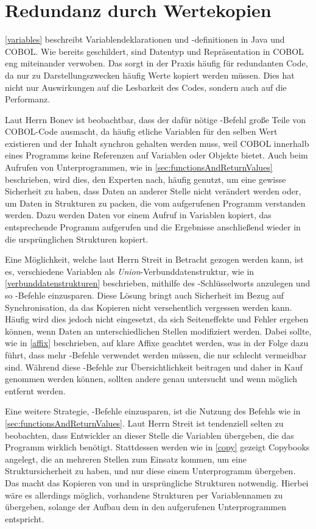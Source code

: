 \section{Redundanz durch Wertekopien}
\autoref{variables} beschreibt Variablendeklarationen und -definitionen in Java und COBOL. Wie bereits geschildert, sind Datentyp und Repräsentation in COBOL eng miteinander verwoben. Das sorgt in der Praxis häufig für redundanten Code, da nur zu Darstellungszwecken häufig Werte kopiert werden müssen. Dies hat nicht nur Auswirkungen auf die Lesbarkeit des Codes, sondern auch auf die Performanz.

Laut Herrn Bonev ist beobachtbar, dass der dafür nötige -Befehl große Teile von COBOL-Code ausmacht, da häufig etliche Variablen für den selben Wert existieren und der Inhalt synchron gehalten werden muss, weil COBOL innerhalb eines Programms keine Referenzen auf Variablen oder Objekte bietet. Auch beim Aufrufen von Unterprogrammen, wie in \autoref{sec:functionsAndReturnValues} beschrieben, wird dies, den Experten nach, häufig genutzt, um eine gewisse Sicherheit zu haben, dass Daten an anderer Stelle nicht verändert werden oder, um Daten in Strukturen zu packen, die vom aufgerufenen Programm verstanden werden. Dazu werden Daten vor einem Aufruf in Variablen kopiert, das entsprechende Programm aufgerufen und die Ergebnisse anschließend wieder in die ursprünglichen Strukturen kopiert.

Eine Möglichkeit, welche laut Herrn Streit in Betracht gezogen werden kann, ist es, verschiedene Variablen als \textit{Union}-Verbunddatenstruktur, wie in \autoref{verbunddatenstrukturen} beschrieben, mithilfe des -Schlüsselworts anzulegen und so -Befehle einzusparen. Diese Lösung bringt auch Sicherheit im Bezug auf Synchronisation, da das Kopieren nicht versehentlich vergessen werden kann. Häufig wird dies jedoch nicht eingesetzt, da sich Seiteneffekte und Fehler ergeben können, wenn Daten an unterschiedlichen Stellen modifiziert werden. Dabei sollte, wie in \autoref{affix} beschrieben, auf klare Affixe geachtet werden, was in der Folge dazu führt, dass mehr -Befehle verwendet werden müssen, die nur schlecht vermeidbar sind. Während diese -Befehle zur Übersichtlichkeit beitragen und daher in Kauf genommen werden können, sollten andere genau untersucht und wenn möglich entfernt werden.

Eine weitere Strategie, -Befehle einzusparen, ist die Nutzung des  Befehls wie in \autoref{sec:functionsAndReturnValues}. Laut Herrn Streit ist tendenziell selten zu beobachten, dass Entwickler an dieser Stelle die Variablen übergeben, die das Programm wirklich benötigt. Stattdessen werden wie in \autoref{copy} gezeigt Copybooks angelegt, die an mehreren Stellen zum Einsatz kommen, um eine Struktursicherheit zu haben, und nur diese einem Unterprogramm übergeben. Das macht das Kopieren von und in ursprüngliche Strukturen notwendig. Hierbei wäre es allerdings möglich, vorhandene Strukturen per Variablennamen zu übergeben, solange der Aufbau dem in den aufgerufenen Unterprogrammen entspricht.

